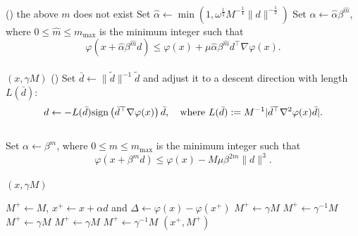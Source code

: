 \begin{algorithm2e}[htbp]
{{\begin{equation}
         \end{equation} \\
         \uIf
         ()
         {the above $m$ does not exist}
         {
            Set $\hat \alpha \gets \min(1,\omega^{\frac{1}{2}} M^{-\frac{1}{4}} \| d \|^{-\frac{1}{2}})$\;
            Set $\alpha \gets \hat \alpha \beta^{\hat m} $,
            where $0 \leq \hat m \leq m_{\mathrm{max}}$ is the minimum integer such that
            \begin{equation}
                \label{eqn:smooth-line-search-sol-smaller-stepsize}
                \varphi(x + \hat \alpha \beta^{\hat m} d) \leq \varphi(x) + \mu \hat \alpha \beta^{\hat m} d^\top \nabla \varphi(x). %
            \end{equation} \\
        {
            \Return $(x, \gamma M)$
        }
         }
     } \uElse
        ()
      {
         Set $\bar d \gets \| \tilde d \|^{-1} \tilde d$ and adjust it to a descent direction with length $L(\bar d)$:
         \begin{equation}
             \label{eqn:smooth-line-search-nc-direction}
             d \gets -
             L(\bar d)
             \textrm{sign}\left (\bar d^\top \nabla \varphi(x)\right ) 
             \bar d,
             \quad 
             \text{where }
             L(\bar d) := M^{-1} |\bar d^\top \nabla^2\varphi(x) \bar d|.
         \end{equation}
         \\
         Set $\alpha \gets \beta^m$, where $0 \leq m \leq m_{\mathrm{max}}$ is the minimum integer such that %
         \begin{equation}
             \label{eqn:smooth-line-search-nc}
             \varphi(x + \beta^{m} d) \leq \varphi(x) - M \mu \beta^{2m} \| d \|^3.
         \end{equation} \\ 
        {
            \Return $(x, \gamma M)$
        }
     }

     
     $M^+ \gets M$, $x^+ \gets x + \alpha d$ and $\Delta \gets \varphi(x) - \varphi(x^+)$\;
     {
        { $M^+\gets \gamma M$ }
        { $M^+\gets \gamma^{-1} M$ }
    }  { $M^+\gets \gamma M$ }
     { $M^+\gets \gamma M$ }
         {
            $M^+\gets \gamma^{-1} M$
        } %
    \Return $(x^+, M^+)$\;
    }
\end{algorithm2e}

